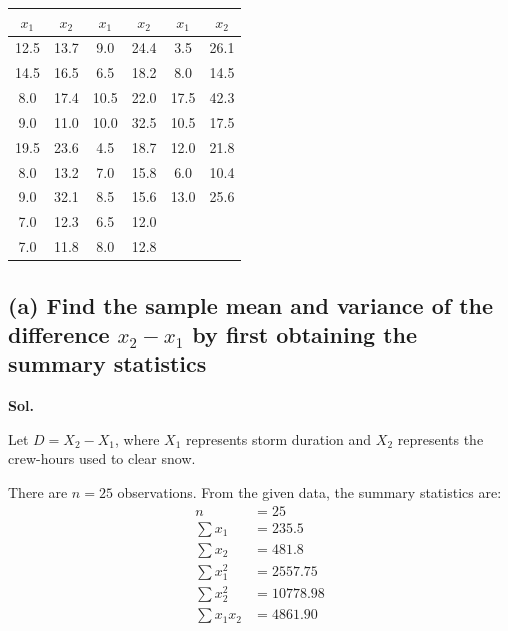 \documentclass[12pt]{article}
\begin{document}
\begin{table}[h!]
\centering
\begin{tabular}{cccccc}
\toprule
$x_1$ & $x_2$ & $x_1$ & $x_2$ & $x_1$ & $x_2$ \\
\midrule
12.5 & 13.7 & 9.0  & 24.4 & 3.5  & 26.1 \\
14.5 & 16.5 & 6.5  & 18.2 & 8.0  & 14.5 \\
8.0  & 17.4 & 10.5 & 22.0 & 17.5 & 42.3 \\
9.0  & 11.0 & 10.0 & 32.5 & 10.5 & 17.5 \\
19.5 & 23.6 & 4.5  & 18.7 & 12.0 & 21.8 \\
8.0  & 13.2 & 7.0  & 15.8 & 6.0  & 10.4 \\
9.0  & 32.1 & 8.5  & 15.6 & 13.0 & 25.6 \\
7.0  & 12.3 & 6.5  & 12.0 &      &      \\
7.0  & 11.8 & 8.0  & 12.8 &      &      \\
\bottomrule
\end{tabular}
\end{table}

\vspace{0.2cm}

\subsection*{(a) Find the sample mean and variance of the difference $x_2 - x_1$ by first obtaining the summary statistics}

\vspace{0.2cm}

\textbf{Sol.}

\vspace{0.2cm}

Let $D = X_2 - X_1$, where $X_1$ represents storm duration and $X_2$ represents the crew-hours used to clear snow.

\vspace{0.2cm}

There are $n = 25$ observations. From the given data, the summary statistics are:
\begin{align*}
n &= 25 \\
\sum x_1 &= 235.5 \\
\sum x_2 &= 481.8 \\
\sum x_1^2 &= 2557.75 \\
\sum x_2^2 &= 10778.98 \\
\sum x_1 x_2 &= 4861.90
\end{align*}
\end{document}
